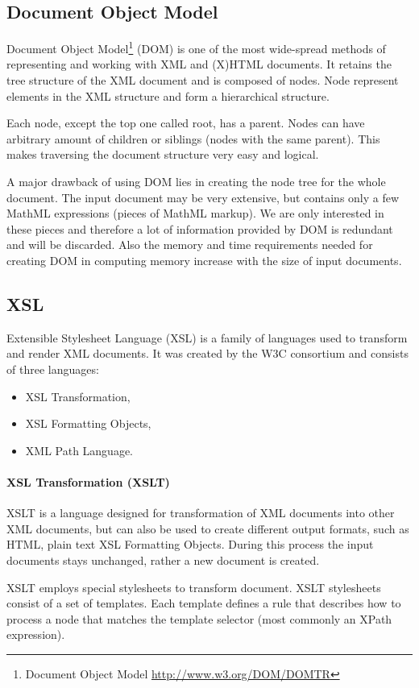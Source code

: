 \documentclass[11pt,oneside,final]{fithesis2}
\begin{document}
\iffalse
\subsection{Document Object Model}
Document Object Model\footnote{Document Object Model \url{http://www.w3.org/DOM/DOMTR}} (DOM) is one of the most wide-spread methods of representing and working with XML and (X)HTML documents. It retains the tree structure of the XML document and is composed of nodes. Node represent elements in the XML structure and form a hierarchical structure. 

Each node, except the top one called root, has a parent. Nodes can have arbitrary amount of children or siblings (nodes with the same parent). This makes traversing the document structure very easy and logical. 

A major drawback of using DOM lies in creating the node tree for the whole document. The input document may be very extensive, but contains only a few MathML expressions (pieces of MathML markup). We are only interested in these pieces and therefore a lot of information provided by DOM is redundant and will be discarded. Also the memory and time requirements needed for creating DOM in computing memory increase with the size of input documents.

\subsection{XSL}
\label{section:xsl}
Extensible Stylesheet Language (XSL) is a family of languages used to transform and render XML documents. It was created by the W3C consortium and consists of three languages:
\begin{itemize}
\item XSL Transformation,
\item XSL Formatting Objects,
\item XML Path Language.
\end{itemize}

\paragraph*{XSL Transformation (XSLT)} 
XSLT is a language designed for transformation of XML documents into other XML documents, but can also be used to create different output formats, such as HTML, plain text XSL Formatting Objects. During this process the input documents stays unchanged, rather a new document is created. 

XSLT employs special stylesheets to transform document. XSLT stylesheets consist of a set of templates. Each template defines a rule that describes how to process a node that matches the template selector (most commonly an XPath expression). 
\end{document}
